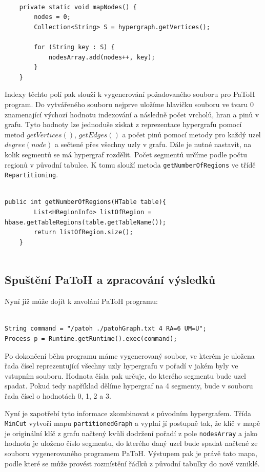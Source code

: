 \documentclass[thesis=M,czech]{FITthesis}[2012/06/26]
\begin{document}
\begin{lstlisting}[frame=single]  % Start your code-block
    
    private static void mapNodes() {
        nodes = 0;
        Collection<String> S = hypergraph.getVertices();

        for (String key : S) {
            nodesArray.add(nodes++, key);
        }
    }
\end{lstlisting}

Indexy těchto polí pak slouží k vygenerování požadovaného souboru pro PaToH program. Do vytvářeného souboru nejprve uložíme hlavičku souboru ve tvaru 0 znamenající výchozí hodnotu indexování a následně počet vrcholů, hran a pinů v grafu. Tyto hodnoty lze jednoduše získat z reprezentace hypergrafu pomocí metod $getVertices()$, $getEdges()$ a počet pinů pomocí metody pro každý uzel $degree(node)$ a sečtené přes všechny uzly v grafu.
Dále je nutné nastavit, na kolik segmentů se má hypergraf rozdělit. Počet segmentů určíme podle počtu regionů v původní tabulce. K tomu slouží metoda \texttt{getNumberOfRegions} ve třídě \texttt{Repartitioning}.
\begin{lstlisting}[frame=single]  % Start your code-block

public int getNumberOfRegions(HTable table){
        List<HRegionInfo> listOfRegion = hbase.getTableRegions(table.getTableName());
        return listOfRegion.size();
    }


\end{lstlisting}
\subsection{Spuštění PaToH a zpracování výsledků}
Nyní již může dojít k zavolání PaToH programu:
\begin{lstlisting}[frame=single]  % Start your code-block

String command = "/patoh ./patohGraph.txt 4 RA=6 UM=U";
Process p = Runtime.getRuntime().exec(command);
\end{lstlisting}

Po dokončení běhu programu máme vygenerovaný soubor, ve kterém je uložena řada čísel reprezentující všechny uzly hypergrafu v pořadí v jakém byly ve vstupním souboru. Hodnota čísla pak určuje, do kterého segmentu bude uzel spadat. Pokud tedy například dělíme hypergraf na 4 segmenty, bude v souboru řada čísel o hodnotách 0, 1, 2 a 3. 

Nyní je zapotřebí tyto informace zkombinovat s původním hypergrafem. Třída \texttt{MinCut} vytvoří mapu \texttt{partitionedGraph} a vyplní jí postupně tak, že klíč v mapě je originální klíč z grafu načtený kvůli dodržení pořadí z pole \texttt{nodesArray} a jako hodnota je uloženo číslo segmentu, do kterého daný uzel bude spadat načtené ze souboru vygenerovaného programem PaToH. Výstupem  pak je právě tato mapa, podle které se může provést rozmístění řádků z původní tabulky do nově vzniklé.
\end{document}
